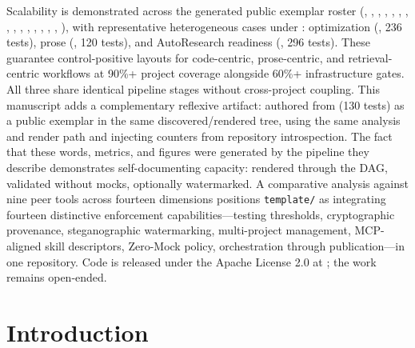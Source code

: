 \documentclass[
]{article}
\begin{document}
Scalability is demonstrated across the generated public exemplar roster
(,
,
,
,
,
,
,
,
,
,
,
,
,
,
,
), with representative
heterogeneous cases under : optimization
(, 236 tests), prose
(, 120 tests), and AutoResearch
readiness (, 296 tests). These
guarantee control-positive layouts for code-centric, prose-centric, and
retrieval-centric workflows at 90\%+ project coverage alongside 60\%+
infrastructure gates. All three share identical pipeline stages without
cross-project coupling. This manuscript adds a complementary reflexive
artifact: authored from 
(130 tests) as a public exemplar in the same discovered/rendered tree,
using the same analysis and render path and injecting counters from
repository introspection. The fact that these words, metrics, and
figures were generated by the pipeline they describe demonstrates
self-documenting capacity: rendered through the DAG, validated without
mocks, optionally watermarked. A comparative analysis against nine peer
tools across fourteen dimensions positions \texttt{template/} as
integrating fourteen distinctive enforcement capabilities---testing
thresholds, cryptographic provenance, steganographic watermarking,
multi-project management, MCP-aligned skill descriptors, Zero-Mock
policy, orchestration through publication---in one repository. Code is
released under the Apache License 2.0 at
; the work remains open-ended.

\newpage

\section{Introduction}\label{introduction}
\end{document}
